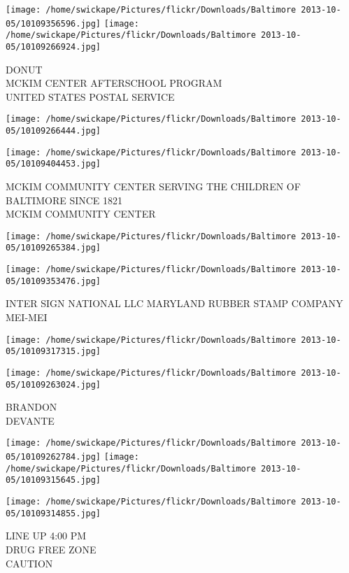 \documentclass[10pt,letterpaper]{article}
\begin{document}
\vspace{0.25in}
\texttt{[image: /home/swickape/Pictures/flickr/Downloads/Baltimore 2013-10-05/10109356596.jpg]}
\texttt{[image: /home/swickape/Pictures/flickr/Downloads/Baltimore 2013-10-05/10109266924.jpg]}

DONUT\\
MCKIM CENTER AFTERSCHOOL PROGRAM\\
UNITED STATES POSTAL SERVICE
\pagebreak

\texttt{[image: /home/swickape/Pictures/flickr/Downloads/Baltimore 2013-10-05/10109266444.jpg]}

\vspace{0.25in}
\texttt{[image: /home/swickape/Pictures/flickr/Downloads/Baltimore 2013-10-05/10109404453.jpg]}

MCKIM COMMUNITY CENTER SERVING THE CHILDREN OF BALTIMORE SINCE 1821\\
MCKIM COMMUNITY CENTER
\pagebreak

\texttt{[image: /home/swickape/Pictures/flickr/Downloads/Baltimore 2013-10-05/10109265384.jpg]}

\vspace{0.25in}
\texttt{[image: /home/swickape/Pictures/flickr/Downloads/Baltimore 2013-10-05/10109353476.jpg]}

INTER SIGN NATIONAL LLC MARYLAND RUBBER STAMP COMPANY\\
MEI{-}MEI
\pagebreak

\texttt{[image: /home/swickape/Pictures/flickr/Downloads/Baltimore 2013-10-05/10109317315.jpg]}

\vspace{0.25in}
\texttt{[image: /home/swickape/Pictures/flickr/Downloads/Baltimore 2013-10-05/10109263024.jpg]}

BRANDON\\
DEVANTE
\pagebreak

\texttt{[image: /home/swickape/Pictures/flickr/Downloads/Baltimore 2013-10-05/10109262784.jpg]}
\texttt{[image: /home/swickape/Pictures/flickr/Downloads/Baltimore 2013-10-05/10109315645.jpg]}

\texttt{[image: /home/swickape/Pictures/flickr/Downloads/Baltimore 2013-10-05/10109314855.jpg]}

LINE UP 4:00 PM\\
DRUG FREE ZONE\\
CAUTION
\pagebreak
\end{document}
